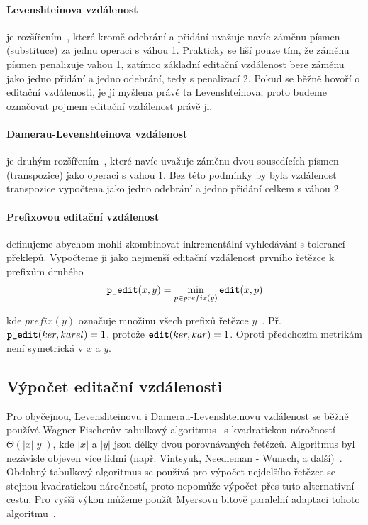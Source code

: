 \documentclass[11pt,letterpaper,oneside,openright]{book}
\newcommand{\bftt}[1]{\texttt{\textbf{#1}}}
\begin{document}
\paragraph{Levenshteinova vzdálenost} je rozšířením~\cite{Levenshtein66}, které
kromě odebrání a přidání uvažuje navíc záměnu písmen (substituce) za jednu
operaci s váhou 1.  Prakticky se liší pouze tím, že záměnu písmen penalizuje
vahou 1, zatímco základní editační vzdálenost bere záměnu jako jedno přidání a
jedno odebrání, tedy s penalizací 2. Pokud se běžně hovoří o editační
vzdálenosti, je jí myšlena právě ta Levenshteinova, proto budeme označovat
pojmem editační vzdálenost právě ji.

\paragraph{Damerau-Levenshteinova vzdálenost} je druhým
rozšířením~\cite{Damerau:1964:TCD:363958.363994}, které navíc uvažuje záměnu
dvou sousedících písmen (transpozice) jako operaci s vahou 1. Bez této podmínky
by byla vzdálenost transpozice vypočtena jako jedno odebrání a jedno přidání
celkem s váhou 2.

\paragraph{Prefixovou editační vzdálenost} definujeme abychom mohli zkombinovat
inkrementální vyhledávání s tolerancí překlepů. Vypočteme ji jako nejmenší
editační vzdálenost prvního řetězce k prefixům druhého \[\bftt{p\_edit}(x, y) =
\min_{p \in prefix(y)} \bftt{edit}(x, p)\]

kde $prefix(y)$ označuje množinu všech prefixů řetězce
$y$~\cite{Bast:2013:EFS:2457465.2457470}. Př.  $\bftt{p\_edit}(ker, karel) =
1$, protože $\bftt{edit}(ker, kar) = 1$. Oproti předchozím metrikám není
symetrická v $x$ a $y$.


\subsection{Výpočet editační vzdálenosti}
Pro obyčejnou, Levenshteinovu i Damerau-Levenshteinovu vzdálenost se běžně
používá Wagner-Fischerův tabulkový
algoritmus~\cite{Wagner:1974:SCP:321796.321811} s kvadratickou náročností
$\Theta(|x||y|)$, kde $|x|$ a $|y|$ jsou délky dvou porovnávaných řetězců.
Algoritmus byl nezávisle objeven více lidmi (např.  Vintsyuk, Needleman -
Wunsch, a další)~\cite{Navarro:2001:GTA:375360.375365}.  Obdobný tabulkový
algoritmus se používá pro výpočet nejdelšího řetězce se stejnou kvadratickou
náročností, proto nepomůže výpočet přes tuto alternativní cestu. Pro vyšší
výkon můžeme použít Myersovu bitově paralelní adaptaci tohoto
algoritmu~\cite{Myers:1999:FBA:316542.316550}.
\end{document}
